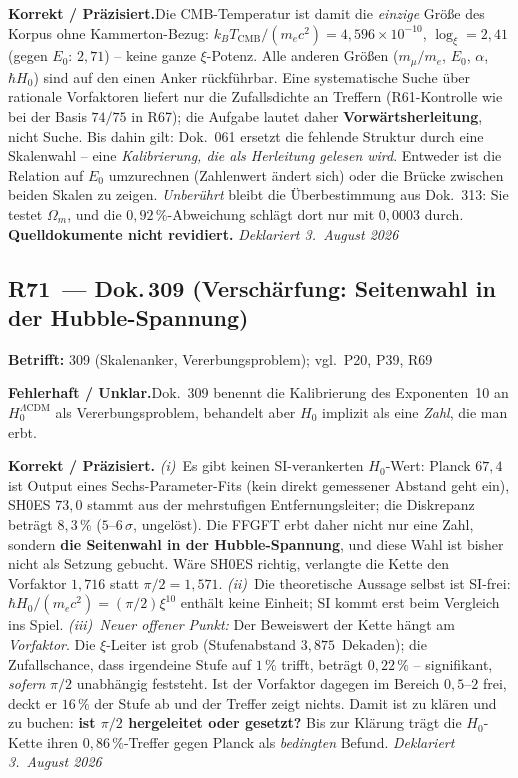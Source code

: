 \smallskip\noindent\textbf{Korrekt / Präzisiert.}\quad Die
CMB-Temperatur ist damit die \emph{einzige} Größe des Korpus ohne
Kammerton-Bezug: $k_BT_\text{CMB}/(m_ec^2) = 4{,}596\times10^{-10}$,
$\log_\xi = 2{,}41$ (gegen $E_0$: $2{,}71$) -- keine ganze
$\xi$-Potenz. Alle anderen Größen ($m_\mu/m_e$, $E_0$, $\alpha$,
$\hbar H_0$) sind auf den einen Anker rückführbar. Eine systematische
Suche über rationale Vorfaktoren liefert nur die Zufallsdichte an
Treffern (R61-Kontrolle wie bei der Basis $74/75$ in R67); die Aufgabe
lautet daher \textbf{Vorwärtsherleitung}, nicht Suche. Bis dahin gilt:
Dok.~061 ersetzt die fehlende Struktur durch eine Skalenwahl -- eine
\emph{Kalibrierung, die als Herleitung gelesen wird}. Entweder ist die
Relation auf $E_0$ umzurechnen (Zahlenwert ändert sich) oder die Brücke
zwischen beiden Skalen zu zeigen. \emph{Unberührt} bleibt die
Überbestimmung aus Dok.~313: Sie testet $\Omega_m$, und die
$0{,}92\,\%$-Abweichung schlägt dort nur mit $0{,}0003$ durch.
\textbf{Quelldokumente nicht revidiert.} \emph{Deklariert 3.~August 2026}

\medskip

\subsection*{R71~--- Dok.\,309 (Verschärfung: Seitenwahl in der
Hubble-Spannung)}

\noindent\textbf{Betrifft:} 309 (Skalenanker, Vererbungsproblem);
vgl.\ P20, P39, R69

\smallskip\noindent\textbf{Fehlerhaft / Unklar.}\quad Dok.~309 benennt
die Kalibrierung des Exponenten~10 an $H_0^{\Lambda\text{CDM}}$ als
Vererbungsproblem, behandelt aber $H_0$ implizit als eine \emph{Zahl},
die man erbt.

\smallskip\noindent\textbf{Korrekt / Präzisiert.}\quad
\emph{(i)}~Es gibt keinen SI-verankerten $H_0$-Wert: Planck $67{,}4$ ist
Output eines Sechs-Parameter-Fits (kein direkt gemessener Abstand geht
ein), SH0ES $73{,}0$ stammt aus der mehrstufigen Entfernungsleiter; die
Diskrepanz beträgt $8{,}3\,\%$ ($5$--$6\,\sigma$, ungelöst). Die FFGFT
erbt daher nicht nur eine Zahl, sondern \textbf{die Seitenwahl in der
Hubble-Spannung}, und diese Wahl ist bisher nicht als Setzung gebucht.
Wäre SH0ES richtig, verlangte die Kette den Vorfaktor $1{,}716$ statt
$\pi/2 = 1{,}571$. \emph{(ii)}~Die theoretische Aussage selbst ist
SI-frei: $\hbar H_0/(m_ec^2) = (\pi/2)\xi^{10}$ enthält keine Einheit;
SI kommt erst beim Vergleich ins Spiel. \emph{(iii)~Neuer offener
Punkt:} Der Beweiswert der Kette hängt am \emph{Vorfaktor}. Die
$\xi$-Leiter ist grob (Stufenabstand $3{,}875$~Dekaden); die
Zufallschance, dass irgendeine Stufe auf $1\,\%$ trifft, beträgt
$0{,}22\,\%$ -- signifikant, \emph{sofern} $\pi/2$ unabhängig
feststeht. Ist der Vorfaktor dagegen im Bereich $0{,}5$--$2$ frei,
deckt er $16\,\%$ der Stufe ab und der Treffer zeigt nichts. Damit ist
zu klären und zu buchen: \textbf{ist $\pi/2$ hergeleitet oder gesetzt?}
Bis zur Klärung trägt die $H_0$-Kette ihren $0{,}86\,\%$-Treffer
gegen Planck als \emph{bedingten} Befund.
\emph{Deklariert 3.~August 2026}

